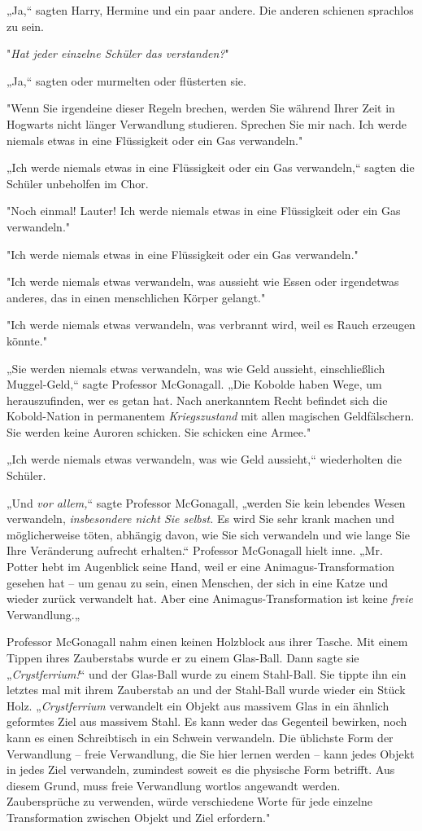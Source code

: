 {„Ja,“ sagten Harry, Hermine und ein paar andere. Die anderen schienen sprachlos zu sein.

"\emph{Hat jeder einzelne Schüler das verstanden?}"

„Ja,“ sagten oder murmelten oder flüsterten sie.

"Wenn Sie irgendeine dieser Regeln brechen, werden Sie während Ihrer Zeit in Hogwarts nicht länger Verwandlung studieren. Sprechen Sie mir nach. Ich werde niemals etwas in eine Flüssigkeit oder ein Gas verwandeln."

„Ich werde niemals etwas in eine Flüssigkeit oder ein Gas verwandeln,“ sagten die Schüler unbeholfen im Chor.

"Noch einmal! Lauter! Ich werde niemals etwas in eine Flüssigkeit oder ein Gas verwandeln."

"Ich werde niemals etwas in eine Flüssigkeit oder ein Gas verwandeln."

"Ich werde niemals etwas verwandeln, was aussieht wie Essen oder irgendetwas anderes, das in einen menschlichen Körper gelangt."

"Ich werde niemals etwas verwandeln, was verbrannt wird, weil es Rauch erzeugen könnte."

„Sie werden niemals etwas verwandeln, was wie Geld aussieht, einschließlich Muggel-Geld,“ sagte Professor McGonagall. „Die Kobolde haben Wege, um herauszufinden, wer es getan hat. Nach anerkanntem Recht befindet sich die Kobold-Nation in permanentem \emph{Kriegszustand} mit allen magischen Geldfälschern. Sie werden keine Auroren schicken. Sie schicken eine Armee."

„Ich werde niemals etwas verwandeln, was wie Geld aussieht,“ wiederholten die Schüler.

„Und \emph{vor allem,}“ sagte Professor McGonagall, „werden Sie kein lebendes Wesen verwandeln, \emph{insbesondere nicht Sie selbst.} Es wird Sie sehr krank machen und möglicherweise töten, abhängig davon, wie Sie sich verwandeln und wie lange Sie Ihre Veränderung aufrecht erhalten.“ Professor McGonagall hielt inne. „Mr. Potter hebt im Augenblick seine Hand, weil er eine Animagus-Transformation gesehen hat -- um genau zu sein, einen Menschen, der sich in eine Katze und wieder zurück verwandelt hat. Aber eine Animagus-Transformation ist keine \emph{freie} Verwandlung.„

Professor McGonagall nahm einen keinen Holzblock aus ihrer Tasche. Mit einem Tippen ihres Zauberstabs wurde er zu einem Glas-Ball. Dann sagte sie „\emph{Crystferrium!}“ und der Glas-Ball wurde zu einem Stahl-Ball. Sie tippte ihn ein letztes mal mit ihrem Zauberstab an und der Stahl-Ball wurde wieder ein Stück Holz. „\emph{Crystferrium} verwandelt ein Objekt aus massivem Glas in ein ähnlich geformtes Ziel aus massivem Stahl. Es kann weder das Gegenteil bewirken, noch kann es einen Schreibtisch in ein Schwein verwandeln. Die üblichste Form der Verwandlung -- freie Verwandlung, die Sie hier lernen werden -- kann jedes Objekt in jedes Ziel verwandeln, zumindest soweit es die physische Form betrifft. Aus diesem Grund, muss freie Verwandlung wortlos angewandt werden. Zaubersprüche zu verwenden, würde verschiedene Worte für jede einzelne Transformation zwischen Objekt und Ziel erfordern."

}
